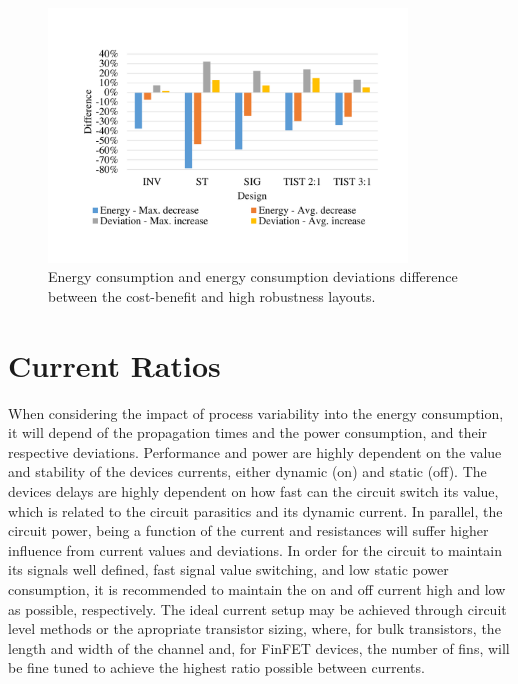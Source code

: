 \documentclass[pgmicro,diss,english]{iiufrgs}
\begin{document}
\begin{figure}[H]
	\centering
        \caption{Energy consumption and energy consumption deviations difference between the cost-benefit and high robustness layouts. \label{CBCompHR}}
      	\includegraphics[width=0.85\textwidth, trim={1.25cm 2cm 2cm 3cm}, clip]{compCB-HR.pdf}
\end{figure}


\section{Current Ratios}




    When considering the impact of process variability into the energy consumption, it will depend of the propagation times and the power consumption, and their respective deviations. Performance and power are highly dependent on the value and stability of the devices currents, either dynamic (on) and static (off). The devices delays are highly dependent on how fast can the circuit switch its value, which is related to the circuit parasitics and its dynamic current. In parallel, the circuit power, being a function of the current and resistances will suffer higher influence from current values and deviations. In order for the circuit to maintain its signals well defined, fast signal value switching, and low static power consumption, it is recommended to maintain the on and off current high and low as possible, respectively. The ideal current setup may be achieved through circuit level methods or the apropriate transistor sizing, where, for bulk transistors, the length and width of the channel and, for FinFET devices, the number of fins, will be fine tuned to achieve the highest ratio possible between currents.
\end{document}
